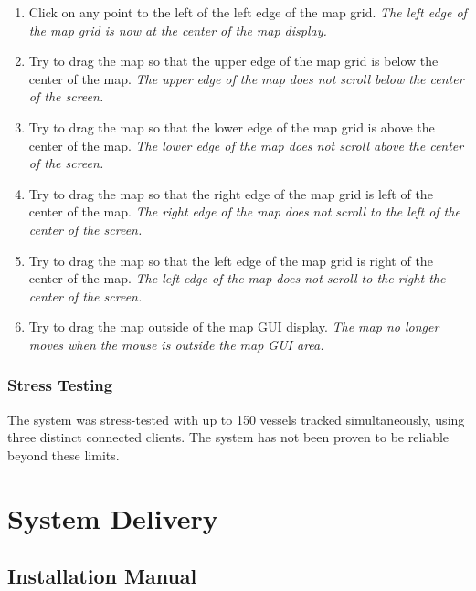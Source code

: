 \documentclass{article}
\begin{document}
\begin{enumerate}
\item Click on any point to the left of the left edge of the map grid. \emph{The left edge of the map grid is now at the center of the map display.}
\item Try to drag the map so that the upper edge of the map grid is below the center of the map. \emph{The upper edge of the map does not scroll below the center of the screen.}
\item Try to drag the map so that the lower edge of the map grid is above the center of the map. \emph{The lower edge of the map does not scroll above the center of the screen.}
\item Try to drag the map so that the right edge of the map grid is left of the center of the map. \emph{The right edge of the map does not scroll to the left of the center of the screen.}
\item Try to drag the map so that the left edge of the map grid is right of the center of the map. \emph{The left edge of the map does not scroll to the right the center of the screen.}
\item Try to drag the map outside of the map GUI display. \emph{The map no longer moves when the mouse is outside the map GUI area.}
\end{enumerate}

\subsubsection{Stress Testing} %


The system was stress-tested with up to 150 vessels tracked simultaneously, using three distinct connected clients. The system has not been proven to be reliable beyond these limits.

\break

\section{System Delivery}


\subsection{Installation Manual}
\end{document}
